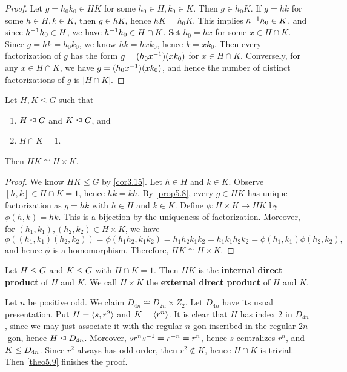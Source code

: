 \begin{proof}
    Let $g = h_0k_0 \in HK$ for some $h_0 \in H, k_0 \in K$. Then $g \in h_0K$. If $g = hk$ for some $h \in H, k \in K$, then $g \in hK$, hence $hK = h_0K$. This implies $h^{-1} h_0 \in K$, and since $h^{-1} h_0 \in H$, we have $h^{-1} h_0 \in H \cap K$. Set $h_0 = hx$ for some $x \in H \cap K$. Since $g = hk = h_0k_0$, we know $hk = hxk_0$, hence $k = xk_0$. Then every factorization of $g$ has the form $g = (h_0x^{-1})(xk_0)$ for $x \in H \cap K$. Conversely, for any $x \in H \cap K$, we have $g = (h_0x^{-1})(xk_0)$, and hence the number of distinct factorizations of $g$ is $|H \cap K|$.
\end{proof}

 \label{theo5.9}
Let $H, K \leq G$ such that
\begin{enumerate}
    \item $H \trianglelefteq G$ and $K \trianglelefteq G$, and
    \item $H \cap K = 1$.
\end{enumerate}
Then $HK \cong H \times K$.
\begin{proof}
    We know $HK \leq G$ by \autoref{cor3.15}. Let $h \in H$ and $k \in K$. Observe $[h, k] \in H \cap K = 1$, hence $hk = kh$. By \autoref{prop5.8}, every $g \in HK$ has unique factorization as $g = hk$ with $h \in H$ and $k \in K$. Define $\phi : H \times K \to HK$ by $\phi(h, k) = hk$. This is a bijection by the uniqueness of factorization. Moreover, for $(h_1, k_1), (h_2, k_2) \in H \times K$, we have
    \[\phi((h_1, k_1)(h_2, k_2)) = \phi(h_1h_2, k_1k_2) = h_1h_2k_1k_2 = h_1k_1h_2k_2 = \phi(h_1, k_1)\phi(h_2, k_2),\]
    and hence $\phi$ is a homomorphism. Therefore, $HK \cong H \times K$.
\end{proof}

 Let $H \trianglelefteq G$ and $K \trianglelefteq G$ with $H \cap K = 1$. Then $HK$ is the \textbf{internal direct product} of $H$ and $K$. We call $H \times K$ the \textbf{external direct product} of $H$ and $K$.

\ex Let $n$ be positive odd. We claim $D_{4n} \cong D_{2n} \times Z_2$. Let $D_{4n}$ have its usual presentation. Put $H = \langle s, r^2\rangle$ and $K = \langle r^n\rangle$. It is clear that $H$ has index 2 in $D_{4n}$, since we may just associate it with the regular $n$-gon inscribed in the regular $2n$-gon, hence $H \trianglelefteq D_{4n}$. Moreover, $sr^ns^{-1} = r^{-n} = r^n$, hence $s$ centralizes $r^n$, and $K \trianglelefteq D_{4n}$. Since $r^2$ always has odd order, then $r^2 \not\in K$, hence $H \cap K$ is trivial. Then \autoref{theo5.9} finishes the proof.

